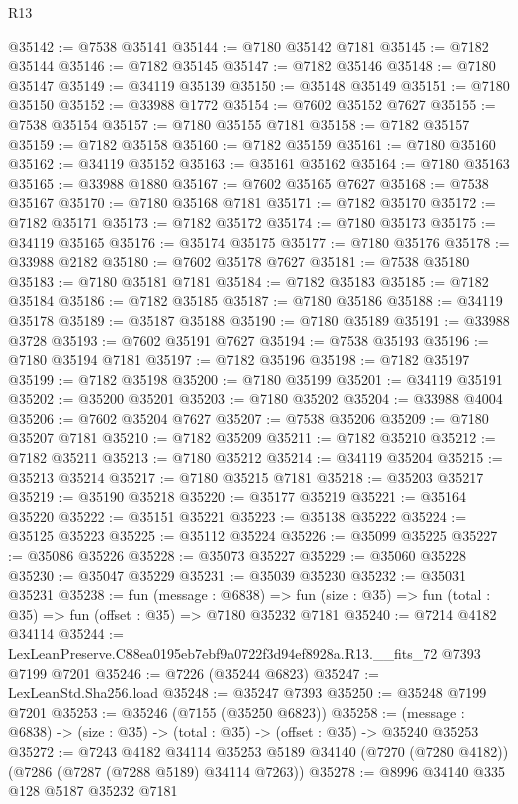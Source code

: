\begin{lexlean}{R13}
\begin{coremodule}
@35142 := @7538 @35141
@35144 := @7180 @35142 @7181
@35145 := @7182 @35144
@35146 := @7182 @35145
@35147 := @7182 @35146
@35148 := @7180 @35147
@35149 := @34119 @35139
@35150 := @35148 @35149
@35151 := @7180 @35150
@35152 := @33988 @1772
@35154 := @7602 @35152 @7627
@35155 := @7538 @35154
@35157 := @7180 @35155 @7181
@35158 := @7182 @35157
@35159 := @7182 @35158
@35160 := @7182 @35159
@35161 := @7180 @35160
@35162 := @34119 @35152
@35163 := @35161 @35162
@35164 := @7180 @35163
@35165 := @33988 @1880
@35167 := @7602 @35165 @7627
@35168 := @7538 @35167
@35170 := @7180 @35168 @7181
@35171 := @7182 @35170
@35172 := @7182 @35171
@35173 := @7182 @35172
@35174 := @7180 @35173
@35175 := @34119 @35165
@35176 := @35174 @35175
@35177 := @7180 @35176
@35178 := @33988 @2182
@35180 := @7602 @35178 @7627
@35181 := @7538 @35180
@35183 := @7180 @35181 @7181
@35184 := @7182 @35183
@35185 := @7182 @35184
@35186 := @7182 @35185
@35187 := @7180 @35186
@35188 := @34119 @35178
@35189 := @35187 @35188
@35190 := @7180 @35189
@35191 := @33988 @3728
@35193 := @7602 @35191 @7627
@35194 := @7538 @35193
@35196 := @7180 @35194 @7181
@35197 := @7182 @35196
@35198 := @7182 @35197
@35199 := @7182 @35198
@35200 := @7180 @35199
@35201 := @34119 @35191
@35202 := @35200 @35201
@35203 := @7180 @35202
@35204 := @33988 @4004
@35206 := @7602 @35204 @7627
@35207 := @7538 @35206
@35209 := @7180 @35207 @7181
@35210 := @7182 @35209
@35211 := @7182 @35210
@35212 := @7182 @35211
@35213 := @7180 @35212
@35214 := @34119 @35204
@35215 := @35213 @35214
@35217 := @7180 @35215 @7181
@35218 := @35203 @35217
@35219 := @35190 @35218
@35220 := @35177 @35219
@35221 := @35164 @35220
@35222 := @35151 @35221
@35223 := @35138 @35222
@35224 := @35125 @35223
@35225 := @35112 @35224
@35226 := @35099 @35225
@35227 := @35086 @35226
@35228 := @35073 @35227
@35229 := @35060 @35228
@35230 := @35047 @35229
@35231 := @35039 @35230
@35232 := @35031 @35231
@35238 := fun (message : @6838) =>
  fun (size : @35) => fun (total : @35) => fun (offset : @35) => @7180 @35232 @7181
@35240 := @7214 @4182 @34114
@35244 := LexLeanPreserve.C88ea0195eb7ebf9a0722f3d94ef8928a.R13.__fits_72 @7393 @7199 @7201
@35246 := @7226 (@35244 @6823)
@35247 := LexLeanStd.Sha256.load
@35248 := @35247 @7393
@35250 := @35248 @7199 @7201
@35253 := @35246 (@7155 (@35250 @6823))
@35258 := (message : @6838) -> (size : @35) -> (total : @35) -> (offset : @35) -> @35240 @35253
@35272 := @7243
    @4182
    @34114
    @35253
    @5189
    @34140
    (@7270 (@7280 @4182))
    (@7286 (@7287 (@7288 @5189) @34114 @7263))
@35278 := @8996 @34140 @335 @128 @5187 @35232 @7181

\end{coremodule}
\end{lexlean}
